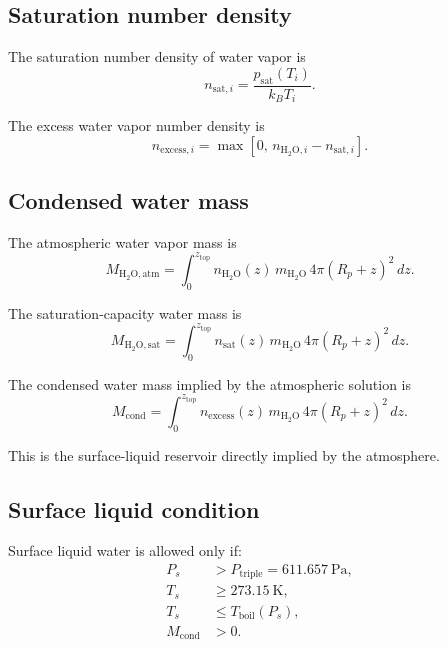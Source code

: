 \documentclass[11pt]{article}
\begin{document}
\subsection{Saturation number density}

The saturation number density of water vapor is
\begin{equation}
    n_{\mathrm{sat},i} =
    \frac{p_{\mathrm{sat}}(T_i)}{k_B T_i}.
\end{equation}

The excess water vapor number density is
\begin{equation}
    n_{\mathrm{excess},i}
    =
    \max\left[
        0,\,
        n_{\mathrm{H_2O},i} - n_{\mathrm{sat},i}
    \right].
\end{equation}

\subsection{Condensed water mass}

The atmospheric water vapor mass is
\begin{equation}
    M_{\mathrm{H_2O,atm}}
    =
    \int_0^{z_{\mathrm{top}}}
    n_{\mathrm{H_2O}}(z)\,
    m_{\mathrm{H_2O}}\,
    4\pi(R_p+z)^2\,dz .
\end{equation}

The saturation-capacity water mass is
\begin{equation}
    M_{\mathrm{H_2O,sat}}
    =
    \int_0^{z_{\mathrm{top}}}
    n_{\mathrm{sat}}(z)\,
    m_{\mathrm{H_2O}}\,
    4\pi(R_p+z)^2\,dz .
\end{equation}

The condensed water mass implied by the atmospheric solution is
\begin{equation}
    M_{\mathrm{cond}}
    =
    \int_0^{z_{\mathrm{top}}}
    n_{\mathrm{excess}}(z)\,
    m_{\mathrm{H_2O}}\,
    4\pi(R_p+z)^2\,dz .
\end{equation}

This is the surface-liquid reservoir directly implied by the atmosphere.

\subsection{Surface liquid condition}

Surface liquid water is allowed only if:
\begin{align}
    P_s &> P_{\mathrm{triple}} = 611.657\ \mathrm{Pa}, \\
    T_s &\geq 273.15\ \mathrm{K}, \\
    T_s &\leq T_{\mathrm{boil}}(P_s), \\
    M_{\mathrm{cond}} &> 0.
\end{align}
\end{document}
